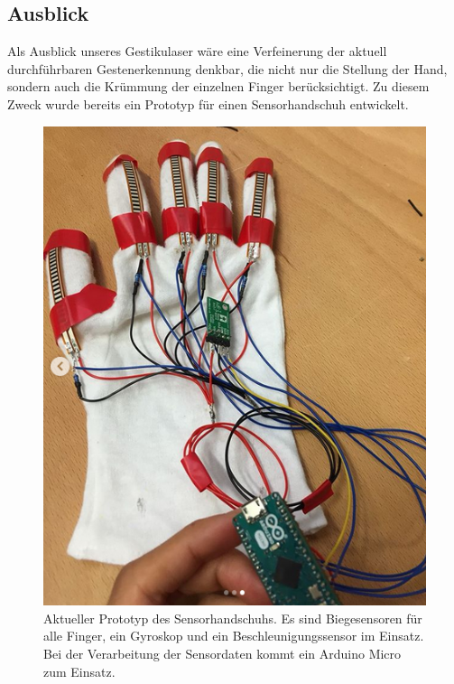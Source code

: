 \documentclass{sciposter}
\begin{document}
\begin{multicols}{3}
\section{Ausblick}
Als Ausblick unseres Gestikulaser wäre eine Verfeinerung der aktuell durchführbaren Gestenerkennung
denkbar, die nicht nur die Stellung der Hand, sondern auch die Krümmung der
einzelnen Finger berücksichtigt. Zu diesem Zweck wurde bereits ein Prototyp für einen
Sensorhandschuh entwickelt.

\begin{figure}[h]
	\centering
	\includegraphics[scale=1.4]{figures/Sensorhandschuh}
	\caption{Aktueller Prototyp des Sensorhandschuhs. Es sind Biegesensoren für alle Finger, ein Gyroskop und ein Beschleunigungssensor im Einsatz. Bei der  
	Verarbeitung der Sensordaten kommt ein Arduino Micro zum Einsatz.}
	\label{fig:Sensorhandschuh}
\end{figure}


\end{multicols}
\end{document}
